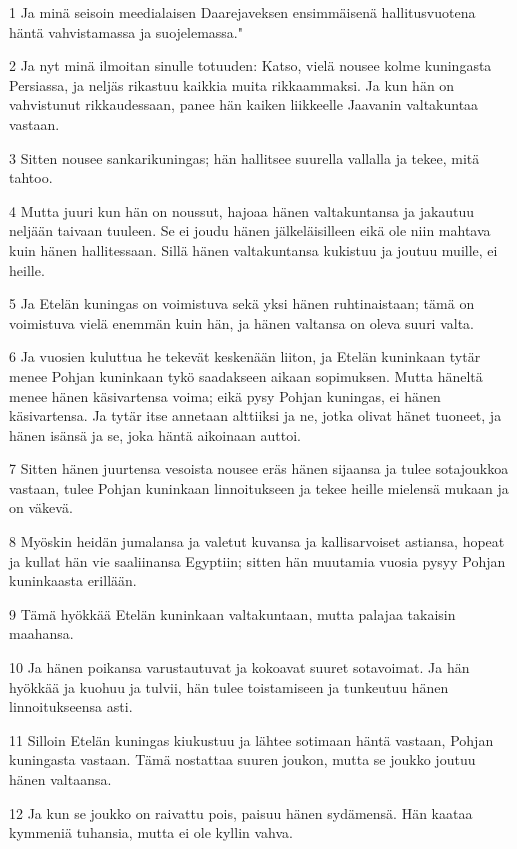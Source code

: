 \par 1 Ja minä seisoin meedialaisen Daarejaveksen ensimmäisenä hallitusvuotena häntä vahvistamassa ja suojelemassa."
\par 2 Ja nyt minä ilmoitan sinulle totuuden: Katso, vielä nousee kolme kuningasta Persiassa, ja neljäs rikastuu kaikkia muita rikkaammaksi. Ja kun hän on vahvistunut rikkaudessaan, panee hän kaiken liikkeelle Jaavanin valtakuntaa vastaan.
\par 3 Sitten nousee sankarikuningas; hän hallitsee suurella vallalla ja tekee, mitä tahtoo.
\par 4 Mutta juuri kun hän on noussut, hajoaa hänen valtakuntansa ja jakautuu neljään taivaan tuuleen. Se ei joudu hänen jälkeläisilleen eikä ole niin mahtava kuin hänen hallitessaan. Sillä hänen valtakuntansa kukistuu ja joutuu muille, ei heille.
\par 5 Ja Etelän kuningas on voimistuva sekä yksi hänen ruhtinaistaan; tämä on voimistuva vielä enemmän kuin hän, ja hänen valtansa on oleva suuri valta.
\par 6 Ja vuosien kuluttua he tekevät keskenään liiton, ja Etelän kuninkaan tytär menee Pohjan kuninkaan tykö saadakseen aikaan sopimuksen. Mutta häneltä menee hänen käsivartensa voima; eikä pysy Pohjan kuningas, ei hänen käsivartensa. Ja tytär itse annetaan alttiiksi ja ne, jotka olivat hänet tuoneet, ja hänen isänsä ja se, joka häntä aikoinaan auttoi.
\par 7 Sitten hänen juurtensa vesoista nousee eräs hänen sijaansa ja tulee sotajoukkoa vastaan, tulee Pohjan kuninkaan linnoitukseen ja tekee heille mielensä mukaan ja on väkevä.
\par 8 Myöskin heidän jumalansa ja valetut kuvansa ja kallisarvoiset astiansa, hopeat ja kullat hän vie saaliinansa Egyptiin; sitten hän muutamia vuosia pysyy Pohjan kuninkaasta erillään.
\par 9 Tämä hyökkää Etelän kuninkaan valtakuntaan, mutta palajaa takaisin maahansa.
\par 10 Ja hänen poikansa varustautuvat ja kokoavat suuret sotavoimat. Ja hän hyökkää ja kuohuu ja tulvii, hän tulee toistamiseen ja tunkeutuu hänen linnoitukseensa asti.
\par 11 Silloin Etelän kuningas kiukustuu ja lähtee sotimaan häntä vastaan, Pohjan kuningasta vastaan. Tämä nostattaa suuren joukon, mutta se joukko joutuu hänen valtaansa.
\par 12 Ja kun se joukko on raivattu pois, paisuu hänen sydämensä. Hän kaataa kymmeniä tuhansia, mutta ei ole kyllin vahva.
